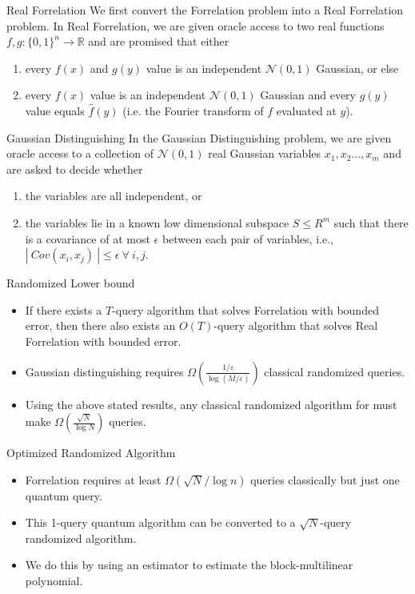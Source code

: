 \documentclass[10pt]{beamer}
\begin{document}
\begin{frame}{Real Forrelation}
We first convert the Forrelation problem into a Real Forrelation problem. In Real Forrelation, we are given oracle access to two real functions $f,g\colon \{0,1\}^{n}\rightarrow \mathbb{R}$ and are promised that either
\begin{enumerate}
    \item every $f(x)$ and $g(y)$ value is an independent $\mathcal{N}(0,1)$ Gaussian, or else
    \item every $f(x)$ value is an independent $\mathcal{N}(0,1)$ Gaussian and every $g(y)$ value equals $\hat{f}(y)$ (i.e. the Fourier transform of $f$ evaluated at $y$).
\end{enumerate}
\end{frame}

\begin{frame}{Gaussian Distinguishing}
In the Gaussian Distinguishing problem, we are given oracle access to a collection of $\mathcal{N}(0,1)$ real Gaussian variables $x_{1},x_{2}..., x_{m}$ and are asked to decide whether 
\begin{enumerate}
    \item the variables are all independent, or
    \item the variables lie in a known low dimensional subspace $S \leq R^{m}$ such that there is a covariance of at most $\epsilon$ between each pair of variables, i.e., $ |~Cov(x_{i},x_{j})~| \leq \epsilon ~\forall~ i,j$.
\end{enumerate}
\end{frame}

\begin{frame}{Randomized Lower bound}
\begin{itemize}
    \item If there exists a $T$-query algorithm that solves Forrelation with bounded error, then there also exists an $O(T)$-query algorithm that solves Real Forrelation with bounded error.
    \item Gaussian distinguishing requires $\Omega\left(\frac{1 / \varepsilon}{\log (M / \varepsilon)}\right)$ classical randomized queries.
    \item Using the above stated results, any classical randomized algorithm for must make $\Omega(\frac{\sqrt{N}}{\log N})$ queries.
\end{itemize}
\end{frame}

\begin{frame}{Optimized Randomized Algorithm}
\begin{itemize}
    \item Forrelation requires at least $\Omega(\sqrt{N}/\log n)$ queries classically but just one quantum query.
    \item This 1-query quantum algorithm can be converted to a $\sqrt{N}$-query randomized algorithm.
    \item  We do this by using an estimator to estimate the block-multilinear polynomial.
\end{itemize}
\end{frame}

\begin{frame}[allowframebreaks]
    \frametitle{}
    
\end{frame}
\end{document}
